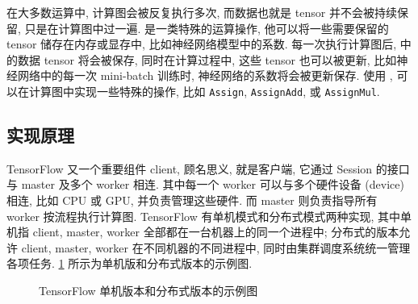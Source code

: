 在大多数运算中, 计算图会被反复执行多次, 而数据也就是 tensor 并不会被持续保留, 只是在计算图中过一遍.  是一类特殊的运算操作, 他可以将一些需要保留的 tensor 储存在内存或显存中, 比如神经网络模型中的系数. 每一次执行计算图后,  中的数据 tensor 将会被保存, 同时在计算过程中, 这些 tensor 也可以被更新, 比如神经网络中的每一次 mini-batch 训练时, 神经网络的系数将会被更新保存. 使用 , 可以在计算图中实现一些特殊的操作, 比如 \texttt{Assign}, \texttt{AssignAdd}, 或 \texttt{AssignMul}.

\subsection{实现原理}
TensorFlow 又一个重要组件 client, 顾名思义, 就是客户端, 它通过 Session 的接口与 master 及多个 worker 相连. 其中每一个 worker 可以与多个硬件设备 (device) 相连, 比如 CPU 或 GPU, 并负责管理这些硬件. 而 master 则负责指导所有 worker 按流程执行计算图. TensorFlow 有单机模式和分布式模式两种实现, 其中单机指 client, master, worker 全部都在一台机器上的同一个进程中; 分布式的版本允许 client, master, worker 在不同机器的不同进程中, 同时由集群调度系统统一管理各项任务. \cref{fig:local implementation and distributed implementation of tensorflow} 所示为单机版和分布式版本的示例图.%
%
\begin{figure}[!htb]
    
    \caption{TensorFlow 单机版本和分布式版本的示例图}
    \label{fig:local implementation and distributed implementation of tensorflow}
\end{figure}
